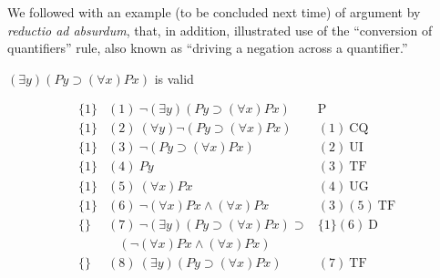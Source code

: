 We followed with an example (to be concluded next time) of argument by \emph{reductio ad absurdum}, that, in addition, illustrated use of the ``conversion of quantifiers'' rule, also known as ``driving a negation across a quantifier.'' 
\begin{center}
$(\exists y)(Py \supset (\forall x)Px)$ is valid
\end{center}
\[
\begin{array}{lll}
\{1\}   & (1)\ \neg (\exists y)(Py \supset (\forall x)Px)  & \mathrm{P}\\
\{1\}   & (2)\ (\forall y) \neg (Py \supset (\forall x)Px)  & (1)\
\mathrm{CQ}\\ 
\{1\}   & (3)\ \neg (Py \supset (\forall x)Px)  & (2)\ \mathrm{UI}\\
\{1\}   & (4)\ Py  & (3)\ \mathrm{TF}\\
\{1\}   & (5)\ (\forall x)Px  & (4)\ \mathrm{UG}\\
\{1\}   & (6)\ \neg (\forall x)Px \wedge (\forall x)Px  & (3)(5)\ \mathrm{TF}\\
\{\}   & (7)\ \neg (\exists y)(Py \supset (\forall x)Px) \supset & \{1\}(6)\
\mathrm{D}\\ 
  &\ \ \ \ (\neg (\forall x)Px \wedge (\forall x)Px) \\
\{\}   & (8)\ (\exists y)(Py \supset (\forall x)Px)  & (7)\ \mathrm{TF}
\end{array}
\]

